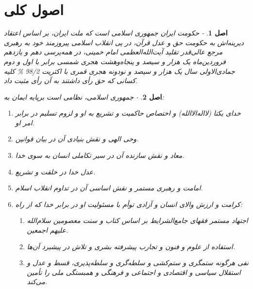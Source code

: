 \documentclass[12pt]{article}
\newtheorem{asl}{اصل}
\begin{document}
\section{اصول کلی}
\begin{asl}- 		
	حکومت ایران جمهوری اسلامی است که ملت ایران‌، بر اساس اعتقاد دیرینه‌اش به حکومت حق و عدل قرآن‌، در پی ‌انقلاب اسلامی پیروزمند خود به رهبری مرجع عالی‌قدر تقلید آیت‌الله‌العظمی امام خمینی، در همه‌پرسی دهم و یازدهم فروردین‌ماه یک هزار و سیصد و پنجاه‌وهشت هجری شمسی برابر با اول و دوم جمادی‌الاولی سال یک هزار و سیصد و نودونه هجری قمری با اکثریت   98/2 \% کلیه کسانی که حق رأی داشتند به آن رأی مثبت داد.
		
\end{asl}
\begin{asl}- 	
	جمهوری اسلامی‌، نظامی است برپایه ایمان به‌:
	\begin{enumerate}
		\item 
	خدای یکتا (لااله‌الاالله) و اختصاص حاکمیت و تشریع به او و لزوم تسلیم در برابر امر او.
		\item
	وحی الهی و نقش بنیادی آن در بیان قوانین‌.
		\item
	معاد و نقش سازنده آن در سیر تکاملی انسان به سوی خدا.
		\item
	عدل خدا در خلقت و تشریع‌.
	 	\item
	امامت و رهبری مستمر و نقش اساسی آن در تداوم انقلاب اسلام.
		\item
	کرامت و ارزش والای انسان و آزادی توأم با مسئولیت او در برابر خدا که از راه‌:
	\begin{enumerate}
		\item 
	اجتهاد مستمر فقهای جامع‌الشرایط بر اساس کتاب و سنت معصومین سلام‌الله علیهم اجمعین‌.	
		\item
	استفاده از علوم و فنون و تجارب پیشرفته بشری و تلاش در پیشبرد آن‌ها.
		\item
	نفی هرگونه ستمگری و ستم‌کشی و سلطه‌گری و سلطه‌پذیری‌، قسط و عدل و استقلال سیاسی و اقتصادی و اجتماعی و فرهنگی و همبستگی ملی را تأمین می‌کند.
	\end{enumerate}
	\end{enumerate}			
\end{asl}
\end{document}
